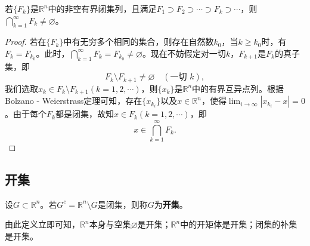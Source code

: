 \documentclass[lang=cn,newtx,10pt,scheme=chinese]{../Template/elegantbook}
\begin{document}
\begin{theorem}[Cantor闭集套定理]\label{theorem:Cantor闭集套定理}
若\(\{F_k\}\)是\(\mathbb{R}^n\)中的非空有界闭集列，且满足\(F_1\supset F_2\supset\cdots\supset F_k\supset\cdots\)，则\(\bigcap_{k = 1}^{\infty}F_k\neq\varnothing\)。
\end{theorem}
\begin{proof}
  若在\(\{F_k\}\)中有无穷多个相同的集合，则存在自然数\(k_0\)，当\(k\geqslant k_0\)时，有\(F_k = F_{k_0}\)。此时，\(\bigcap_{k = 1}^{\infty}F_k = F_{k_0}\neq\varnothing\)。现在不妨假定对一切\(k\)，\(F_{k + 1}\)是\(F_k\)的真子集，即
\[F_k\setminus F_{k + 1}\neq\varnothing\quad (\text{一切 }k),\]
我们选取\(x_k\in F_k\setminus F_{k + 1}(k = 1,2,\cdots)\)，则\(\{x_k\}\)是\(\mathbb{R}^n\)中的有界互异点列。根据Bolzano - Weierstrass定理可知，存在\(\{x_{k_i}\}\)以及\(x\in\mathbb{R}^n\)，使得\(\lim_{i\rightarrow\infty}|x_{k_i}-x| = 0\)。由于每个\(F_k\)都是闭集，故知\(x\in F_k(k = 1,2,\cdots)\)，即
\[x\in\bigcap_{k = 1}^{\infty}F_k.\]

\end{proof}

\subsection{开集}

\begin{definition}[开集]\label{definition:开集}
设\(G\subset\mathbb{R}^n\)。若\(G^c=\mathbb{R}^n\setminus G\)是闭集，则称\(G\)为\textbf{开集}。
\end{definition}
\begin{note}
  由此定义立即可知，\(\mathbb{R}^n\)本身与空集\(\varnothing\)是开集；\(\mathbb{R}^n\)中的开矩体是开集；闭集的补集是开集。
\end{note}
\end{document}
